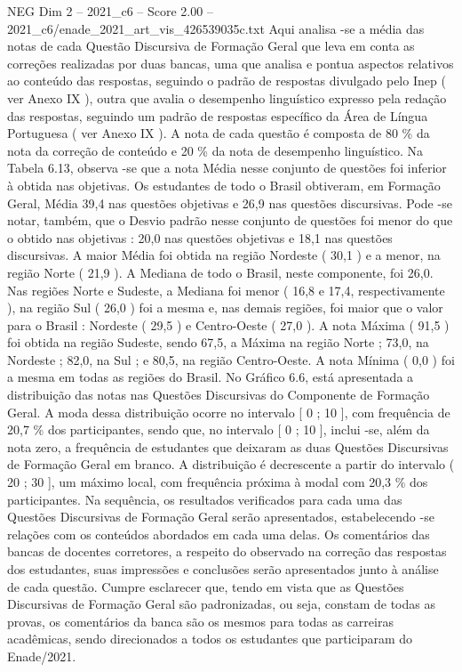 \begin{textsample}{NEG Dim 2 – 2021\_c6 – Score 2.00 – 2021\_c6/enade\_2021\_art\_vis\_426539035c.txt}
Aqui analisa -se a média das notas de cada Questão Discursiva de Formação Geral que leva em conta as correções realizadas por duas bancas, uma que analisa e pontua aspectos relativos ao conteúdo das respostas, seguindo o padrão de respostas divulgado pelo Inep ( ver Anexo IX ), outra que avalia o desempenho linguístico expresso pela redação das respostas, seguindo um padrão de respostas específico da Área de Língua Portuguesa ( ver Anexo IX ).
A nota de cada questão é composta de 80 \% da nota da correção de conteúdo e 20 \% da nota de desempenho linguístico.
Na Tabela 6.13, observa -se que a nota Média nesse conjunto de questões foi inferior à obtida nas objetivas.
Os estudantes de todo o Brasil obtiveram, em Formação Geral, Média 39,4 nas questões objetivas e 26,9 nas questões discursivas.
Pode -se notar, também, que o Desvio padrão nesse conjunto de questões foi menor do que o obtido nas objetivas : 20,0 nas questões objetivas e 18,1 nas questões discursivas.
A maior Média foi obtida na região Nordeste ( 30,1 ) e a menor, na região Norte ( 21,9 ).
A Mediana de todo o Brasil, neste componente, foi 26,0.
Nas regiões Norte e Sudeste, a Mediana foi menor ( 16,8 e 17,4, respectivamente ), na região Sul ( 26,0 ) foi a mesma e, nas demais regiões, foi maior que o valor para o Brasil : Nordeste ( 29,5 ) e Centro-Oeste ( 27,0 ).
A nota Máxima ( 91,5 ) foi obtida na região Sudeste, sendo 67,5, a Máxima na região Norte ; 73,0, na Nordeste ; 82,0, na Sul ; e 80,5, na região Centro-Oeste.
A nota Mínima ( 0,0 ) foi a mesma em todas as regiões do Brasil.
No Gráfico 6.6, está apresentada a distribuição das notas nas Questões Discursivas do Componente de Formação Geral.
A moda dessa distribuição ocorre no intervalo [ 0 ; 10 ], com frequência de 20,7 \% dos participantes, sendo que, no intervalo [ 0 ; 10 ], inclui -se, além da nota zero, a frequência de estudantes que deixaram as duas Questões Discursivas de Formação Geral em branco.
A distribuição é decrescente a partir do intervalo ( 20 ; 30 ], um máximo local, com frequência próxima à modal com 20,3 \% dos participantes.
Na sequência, os resultados verificados para cada uma das Questões Discursivas de Formação Geral serão apresentados, estabelecendo -se relações com os conteúdos abordados em cada uma delas.
Os comentários das bancas de docentes corretores, a respeito do observado na correção das respostas dos estudantes, suas impressões e conclusões serão apresentados junto à análise de cada questão.
Cumpre esclarecer que, tendo em vista que as Questões Discursivas de Formação Geral são padronizadas, ou seja, constam de todas as provas, os comentários da banca são os mesmos para todas as carreiras acadêmicas, sendo direcionados a todos os estudantes que participaram do Enade/2021.

\end{textsample}
